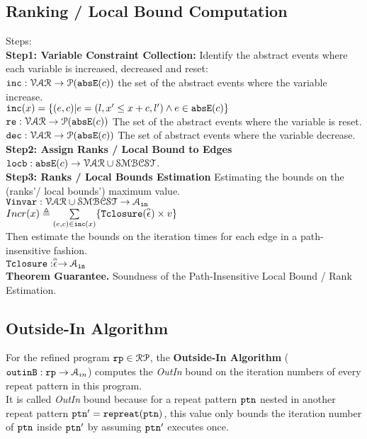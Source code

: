 \subsection{Ranking / Local Bound Computation}
\label{sec:ranking}
Steps:
\\
\textbf{Step1: Variable Constraint Collection:}
Identify the abstract events where each variable is increased, decreased and reset:
\\
${\mathtt{inc}}: \mathcal{VAR} \to \mathcal{P}({\mathtt{abs}}{{\mathtt{E}}}(c)) $
the set of the abstract events where the variable increase.
\\
${\mathtt{inc}}(x) = \{(e, c) | e = (l, x' \leq x + c, l') \land e \in {\mathtt{abs}}{{\mathtt{E}}}(c)\}$
\\
${\mathtt{re}}: \mathcal{VAR} \to \mathcal{P}({\mathtt{abs}}{{\mathtt{E}}}(c)) $
The set of the abstract events where the variable is reset.
\\
${\mathtt{dec}}: \mathcal{VAR} \to \mathcal{P}({\mathtt{abs}}{{\mathtt{E}}}(c)) $
The set of abstract events where the variable decrease.
\\
\textbf{{Step2: Assign Ranks / Local Bound to Edges}}
${\mathtt{locb}}: {\mathtt{abs}}{{\mathtt{E}}}(c) \to \mathcal{VAR} \cup \mathcal{SMBCST}$.
 \\
\textbf{Step3: Ranks / Local Bounds Estimation}
Estimating the bounds on the (ranks'/ local bounds') maximum value.
\\ 
$ {{\mathtt{Vinvar}}}: \mathcal{VAR} \cup \mathcal{SMBCST} \to \mathcal{A}_{{\mathtt{in}}}$
\\
$Incr(x) \triangleq \sum\limits_{(e, c) \in {\mathtt{inc}}(x)}\{{{\mathtt{Tclosure}}}(\stackrel{\scriptscriptstyle{\alpha}}{{\mathtt{\epsilon}}{}}) \times v\}$
\\
Then estimate the bounds on the iteration times
for each edge in a path-insensitive fashion.
\\
${{\mathtt{Tclosure}}}: \stackrel{\scriptscriptstyle{\alpha}}{{\mathtt{\epsilon}}{}} \to \mathcal{A}_{{\mathtt{in}}}$
\\
\textbf{Theorem Guarantee.}
Soundness of the Path-Insensitive Local Bound / Rank Estimation.
\subsection{Outside-In Algorithm}
\label{sec:outinalg}
For the refined program ${\mathtt{rp}} \in \mathcal{RP}$, the \textbf{Outside-In Algorithm} (${\mathtt{outinB}}: {\mathtt{rp}} \to \mathcal{A}_{in}$)
computes the \emph{OutIn} bound on the iteration numbers of every repeat pattern in this program.
\\
It is called \emph{OutIn} bound because for a repeat pattern ${\mathtt{ptn}}$ nested
in another repeat pattern ${\mathtt{ptn}}' = {\mathtt{repreat}}({\mathtt{ptn}})$,
this value only bounds the iteration number of ${\mathtt{ptn}}$ inside ${\mathtt{ptn}}'$ by assuming ${\mathtt{ptn}}'$ executes once.

